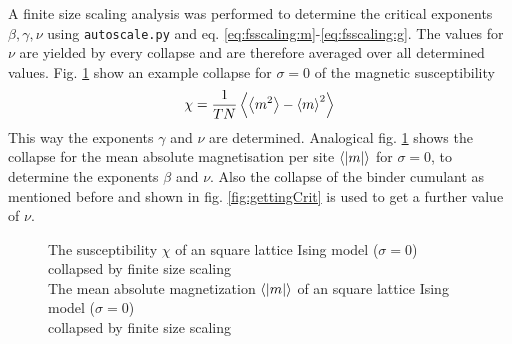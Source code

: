     A finite size scaling analysis was
    performed to determine the critical exponents \(\beta, \gamma, \nu\)
    using \texttt{autoscale.py} \cite{autoscale2009} and eq. \eqref{eq:fsscaling:m}-\eqref{eq:fsscaling:g}.
    The values for \(\nu\) are yielded by every collapse and are therefore
    averaged over all determined values. Fig. \ref{fig:gettingCrit2}
    show an example collapse for \(\sigma=0\) of the magnetic susceptibility
    \begin{equation}
        \chi = \frac{1}{TN}\left< \left< m^2 \right> - \left< m \right>^2 \right>
    \end{equation}
    This way the exponents \(\gamma\) and \(\nu\) are determined.
    Analogical fig. \ref{fig:gettingCrit2}
    shows the collapse for the mean absolute magnetisation per site \(\left< \left\vert m\right\vert \right>\) for \(\sigma=0\),
    to determine the exponents \(\beta\) and \(\nu\).
    Also the collapse of the binder cumulant as mentioned before and shown
    in fig. \ref{fig:gettingCrit}
    is used to get a further value of \(\nu\).
    \begin{figure}[htbp]
        \centering
        \caption[Examples of Determining Critical Temperature and Exponents]
        {
             The susceptibility \(\chi\)
                of an square lattice Ising model (\(\sigma=0\))\\
             collapsed by finite
                size scaling\\
             The mean absolute magnetization \(\left< \left\vert m\right\vert \right>\)
                of an square lattice Ising model (\(\sigma=0\))\\
             collapsed by finite
                size scaling
        }
        \label{fig:gettingCrit2}
    \end{figure}\\
